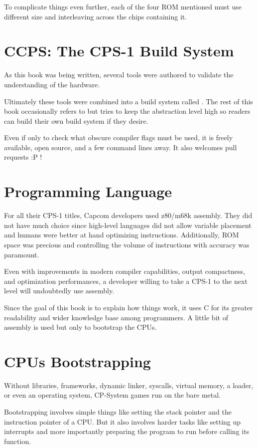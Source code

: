To complicate things even further, each of the four ROM mentioned must use different  size and interleaving across the chips containing it.

\section{CCPS: The CPS-1 Build System}
As this book was being written, several tools were authored to validate the understanding of the hardware.

Ultimately these tools were combined into a build system called . The rest of this book occasionally refers to  but tries to keep the abstraction level high so readers can build their own build system if they desire. 

Even if only to check what obscure compiler flags must be used, it is freely available, open source, and a few command lines away. It also welcomes pull requests :P !




\section{Programming Language}
For all their CPS-1 titles, Capcom developers used z80/m68k assembly. They did not have much choice since high-level languages did not allow variable placement and humans were better at hand optimizing instructions. Additionally, ROM space was precious and controlling the volume of instructions with accuracy was paramount.

Even with improvements in modern compiler capabilities, output compactness, and optimization performances, a developer willing to take a CPS-1 to the next level will undoubtedly use assembly.

Since the goal of this book is to explain how things work, it uses C for its greater readability and wider knowledge base among programmers. A little bit of assembly is used but only to bootstrap the CPUs.
	
\section{CPUs Bootstrapping}
Without libraries, frameworks, dynamic linker, syscalls, virtual memory, a loader, or even an operating system, CP-System games run on the bare metal. 

Bootstrapping involves simple things like setting the stack pointer and the instruction pointer of a CPU. But it also involves harder tasks like setting up interrupts and more importantly preparing the program to run before calling its  function. 


